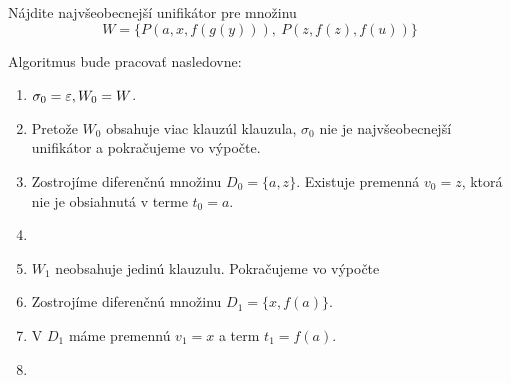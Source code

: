 \begin{priklad}
    Nájdite najvšeobecnejší unifikátor pre množinu
    \begin{equation*}
        W=\{ P(a,x,f(g(y))),\ P(z,f(z),f(u)) \}
    \end{equation*}

    Algoritmus bude pracovať nasledovne:
    \begin{enumerate}
        \item $\sigma_0 = \varepsilon, W_0 = W$.

        \item Pretože $W_0$ obsahuje viac klauzúl klauzula,
            $\sigma_0$ nie je najvšeobecnejší unifikátor a pokračujeme
            vo výpočte.

        \item Zostrojíme diferenčnú množinu $D_0 = \{a, z\}$.
            Existuje premenná $v_0 = z$, 
            ktorá nie je obsiahnutá v terme $t_0 = a$.

        \item {}

        \item $W_1$ neobsahuje jedinú klauzulu. Pokračujeme vo výpočte

        \item Zostrojíme diferenčnú množinu $D_1 = \{x, f(a)\}$.

        \item V $D_1$ máme premennú $v_1 = x$ a term $t_1 = f(a)$.

        \item {}


\end{enumerate}
\end{priklad}

